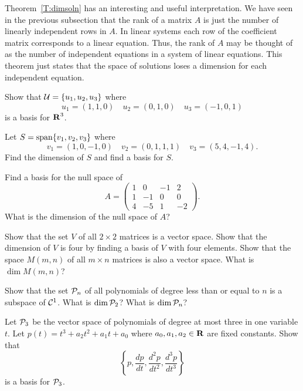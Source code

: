 Theorem~\ref{T:dimsoln} has an interesting and useful interpretation.
We have seen in the previous subsection that the rank of a matrix $A$
is just the number of linearly independent rows in $A$.
In linear systems each row of the coefficient matrix corresponds
to a linear equation.  Thus, the rank of $A$ may be thought of as the
number of independent equations in a system of linear equations.
This theorem just states that the space of solutions loses a dimension
for each independent equation.


\EXER

\TEXER

\begin{exercise} \label{c5.5.1}
Show that ${\cal U}=\{u_1,u_2,u_3\}$ where
\[
u_1=(1,1,0) \quad u_2=(0,1,0) \quad u_3=(-1,0,1)
\]
is a basis for $\mbox{$\bf{R}$}^3$.
\end{exercise}


\begin{exercise} \label{c5.5.2}
Let $S={\rm span}\{v_1,v_2,v_3\}$ where
\[
v_1=(1,0,-1,0) \quad v_2=(0,1,1,1) \quad v_3=(5,4,-1,4).
\]
Find the dimension of $S$ and find a basis for $S$.
\end{exercise}

\begin{exercise} \label{c5.5.3}
Find a basis for the null space of
\[
A =\left(\begin{array}{rrrr} 1 & 0 & -1 & 2\\ 1 & -1 & 0 & 0\\
4 & -5 & 1 & -2 \end{array} \right).
\]
What is the dimension of the null space of $A$?
\end{exercise}

\begin{exercise} \label{c5.5.4}
Show that the set $V$ of all $2\times 2$ matrices is a vector space.
Show that the dimension of $V$ is four by finding a basis of $V$
with four elements.  Show that the space $M(m,n)$ of all $m\times n$
matrices is also a vector space.  What is $\dim M(m,n)$?
\end{exercise}

\begin{exercise} \label{c5.5.5}
Show that the set ${\cal P}_n$ of all polynomials of degree less than
or equal to $n$ is a subspace of ${\cal C}^1$.  What is $\dim {\cal P}_2$?
What is $\dim {\cal P}_n$?
\end{exercise}

\begin{exercise} \label{c5.5.6}
Let ${\cal P}_3$ be the vector space of polynomials of degree at
most three in one variable $t$.  Let $p(t)=t^3+a_2t^2+a_1t+a_0$ where
$a_0,a_1,a_2\in\mbox{$\bf{R}$}$ are fixed constants.  Show that
\[
\left\{ p, \frac{dp}{dt}, \frac{d^2p}{dt^2}, \frac{d^3p}{dt^3}\right\}
\]
is a basis for ${\cal P}_3$.
\end{exercise}


